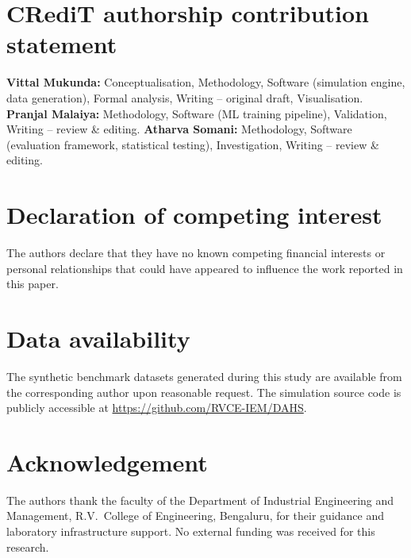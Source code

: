 \documentclass[3p,times]{elsarticle}
\begin{document}
\section*{CRediT authorship contribution statement}

\textbf{Vittal Mukunda:} Conceptualisation, Methodology,
  Software (simulation engine, data generation), Formal analysis,
  Writing -- original draft, Visualisation.
\textbf{Pranjal Malaiya:} Methodology, Software (ML training
  pipeline), Validation, Writing -- review \& editing.
\textbf{Atharva Somani:} Methodology, Software (evaluation
  framework, statistical testing), Investigation,
  Writing -- review \& editing.

\section*{Declaration of competing interest}

The authors declare that they have no known competing financial
interests or personal relationships that could have appeared to
influence the work reported in this paper.

\section*{Data availability}

The synthetic benchmark datasets generated during this study are
available from the corresponding author upon reasonable request.
The simulation source code is publicly accessible at
\url{https://github.com/RVCE-IEM/DAHS}.

\section*{Acknowledgement}

The authors thank the faculty of the Department of Industrial
Engineering and Management, R.V.\ College of Engineering,
Bengaluru, for their guidance and laboratory infrastructure
support.  No external funding was received for this research.
\end{document}
